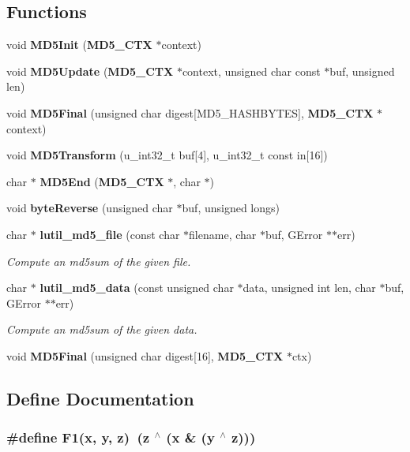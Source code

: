\subsection*{Functions}
\begin{CompactItemize}
\item 
void {\bf MD5Init} ({\bf MD5\_\-CTX} $\ast$context)
\item 
void {\bf MD5Update} ({\bf MD5\_\-CTX} $\ast$context, unsigned char const $\ast$buf, unsigned len)
\item 
void {\bf MD5Final} (unsigned char digest[MD5\_\-HASHBYTES], {\bf MD5\_\-CTX} $\ast$context)
\item 
void {\bf MD5Transform} (u\_\-int32\_\-t buf[4], u\_\-int32\_\-t const in[16])
\item 
char $\ast$ {\bf MD5End} ({\bf MD5\_\-CTX} $\ast$, char $\ast$)
\item 
void {\bf byte\-Reverse} (unsigned char $\ast$buf, unsigned longs)
\item 
char $\ast$ {\bf lutil\_\-md5\_\-file} (const char $\ast$filename, char $\ast$buf, GError $\ast$$\ast$err)
\begin{CompactList}\small\item\em Compute an md5sum of the given file. \item\end{CompactList}\item 
char $\ast$ {\bf lutil\_\-md5\_\-data} (const unsigned char $\ast$data, unsigned int len, char $\ast$buf, GError $\ast$$\ast$err)
\begin{CompactList}\small\item\em Compute an md5sum of the given data. \item\end{CompactList}\item 
void {\bf MD5Final} (unsigned char digest[16], {\bf MD5\_\-CTX} $\ast$ctx)
\end{CompactItemize}


\subsection{Define Documentation}
\subsubsection{\setlength{\rightskip}{0pt plus 5cm}\#define F1(x, y, z)\ (z $^\wedge$ (x \& (y $^\wedge$ z)))}\label{md5_8c_a0}




